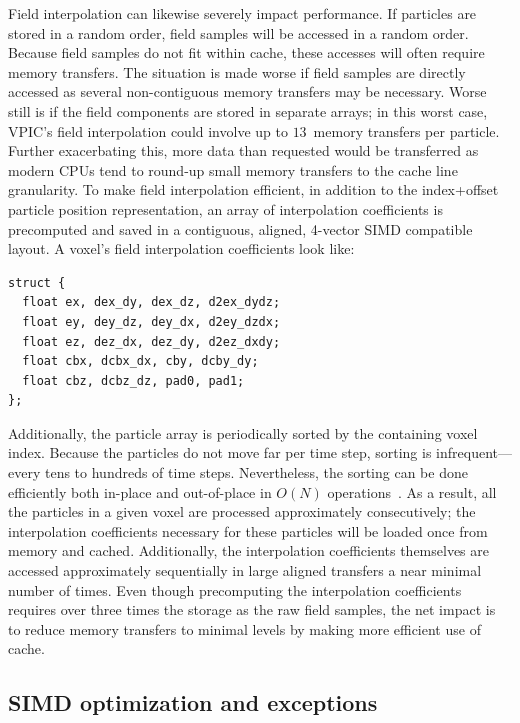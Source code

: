 \documentclass[journal,twoside]{IEEEtran}
\begin{document}
Field interpolation can likewise severely impact performance.  If
particles are stored in a random order, field samples will be accessed
in a random order.  Because field samples do not fit within cache,
these accesses will often require memory transfers.  The situation is
made worse if field samples are directly accessed as several
non-contiguous memory transfers may be necessary.  Worse still is if
the field components are stored in separate arrays; in this worst
case, VPIC's field interpolation could involve up to $13$~memory
transfers per particle.  Further exacerbating this, more data than
requested would be transferred as modern CPUs tend to round-up small
memory transfers to the cache line granularity.  To make field
interpolation efficient, in addition to the index+offset particle
position representation, an array of interpolation coefficients is
precomputed and saved in a contiguous, aligned, 4-vector SIMD
compatible layout.  A voxel's field interpolation coefficients look
like:
\begin{verbatim}
struct {
  float ex, dex_dy, dex_dz, d2ex_dydz;
  float ey, dey_dz, dey_dx, d2ey_dzdx;
  float ez, dez_dx, dez_dy, d2ez_dxdy;
  float cbx, dcbx_dx, cby, dcby_dy;
  float cbz, dcbz_dz, pad0, pad1;
};
\end{verbatim}

Additionally, the particle array is periodically sorted by the
containing voxel index.  Because the particles do not move far per
time step, sorting is infrequent---every tens to hundreds of time
steps.  Nevertheless, the sorting can be done efficiently both
in-place and out-of-place in $O(N)$ operations~\cite{Bowers_2001}.  As
a result, all the particles in a given voxel are processed
approximately consecutively; the interpolation coefficients necessary
for these particles will be loaded once from memory and cached.
Additionally, the interpolation coefficients themselves are accessed
approximately sequentially in large aligned transfers a near minimal
number of times.  Even though precomputing the interpolation
coefficients requires over three times the storage as the raw field
samples, the net impact is to reduce memory transfers to minimal
levels by making more efficient use of cache.

\subsection{SIMD optimization and exceptions}
\end{document}
